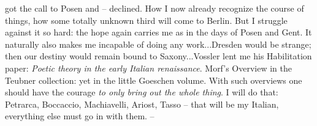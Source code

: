  got the call to Posen and -- declined. How I now already recognize the course of things, how some totally unknown third will come to Berlin. But I struggle against it so hard: the hope again carries me as in the days of Posen and Gent. It naturally also makes me incapable of doing any work...Dresden would be strange; then our destiny would remain bound to Saxony...Vossler lent me his Habilitation paper: \textit{Poetic theory in the early Italian renaissance}.  Morf's Overview in the Teubner collection: yet  in the little Goeschen volume. With such overviews one should have the courage \textit{to only bring out the whole thing}. I will do that: Petrarca, Boccaccio, Machiavelli, Ariost, Tasso -- that will be my Italian, everything else must go in with them. --

\missing



